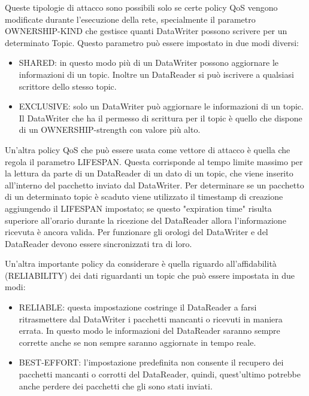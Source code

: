 Queste tipologie di attacco sono possibili solo se certe policy QoS vengono
modificate durante l'esecuzione della rete, specialmente il parametro
OWNERSHIP-KIND che gestisce quanti DataWriter possono scrivere per un
determinato Topic. Questo parametro può essere impostato in due modi diversi:
\begin{itemize}
    \item SHARED: in questo modo più di un DataWriter possono aggiornare le
    informazioni di un topic. Inoltre un DataReader si può iscrivere a
    qualsiasi scrittore dello stesso topic.
    \item EXCLUSIVE: solo un DataWriter può aggiornare le informazioni di un
    topic. Il DataWriter che ha il permesso di scrittura per il topic è quello
    che dispone di un OWNERSHIP-strength con valore più alto.
\end{itemize}


Un'altra policy QoS che può essere usata come vettore di attacco è quella
che regola il parametro LIFESPAN. Questa corrisponde al tempo limite massimo per la
lettura da parte di un DataReader di un dato di un topic, che viene inserito
all'interno del pacchetto inviato dal DataWriter. Per determinare se un pacchetto
di un determinato topic è scaduto viene utilizzato il timestamp di creazione
aggiungendo il LIFESPAN impostato; se questo "expiration time" risulta
superiore all'orario durante la ricezione del DataReader allora l'informazione
ricevuta è ancora valida. Per funzionare gli orologi del DataWriter e del DataReader
devono essere sincronizzati tra di loro.






Un'altra importante policy da considerare è quella riguardo all'affidabilità
(RELIABILITY) dei dati riguardanti un topic che può essere impostata in due
modi:
\begin{itemize}
    \item RELIABLE: questa impostazione costringe il DataReader a farsi
    ritrasmettere dal DataWriter i pacchetti mancanti o ricevuti in maniera errata.
    In questo modo le informazioni del DataReader saranno sempre corrette anche
    se non sempre saranno aggiornate in tempo reale.
    \item BEST-EFFORT: l'impostazione predefinita non consente il recupero
    dei pacchetti mancanti o corrotti
    del DataReader, quindi, quest'ultimo potrebbe anche perdere dei pacchetti 
    che gli sono stati inviati.
\end{itemize}
\cite{dds1.4}



